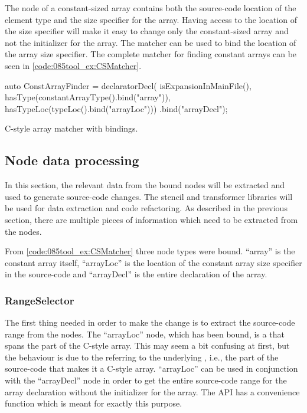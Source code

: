 The  node of a constant-sized array contains both the source-code location of the element type and the size specifier for the array. 
Having access to the location of the size specifier will make it easy to change only the constant-sized array and not the initializer for the array. 
The  matcher can be used to bind the location of the array size specifier.
The complete matcher for finding constant arrays can be seen in \cref{code:085tool_ex:CSMatcher}.

\begin{listing}[H]
    \begin{cppcode}
auto ConstArrayFinder = 
    declaratorDecl(
        isExpansionInMainFile(),
        hasType(constantArrayType().bind("array")),
        hasTypeLoc(typeLoc().bind("arrayLoc")))
    .bind("arrayDecl");
    \end{cppcode}
    \caption{C-style array matcher with bindings.}
    \label{code:085tool_ex:CSMatcher}
\end{listing}

\pagebreak
\subsection{Node data processing}

In this section, the relevant data from the bound nodes will be extracted and used to generate source-code changes. The stencil and transformer libraries will be used for data extraction and code refactoring.
As described in the previous section, there are multiple pieces of information which need to be extracted from the nodes. 

From \cref{code:085tool_ex:CSMatcher} three node types were bound. ``array'' is the constant array itself, ``arrayLoc'' is the location of the constant array size specifier in the source-code and ``arrayDecl'' is the entire declaration of the array.

\subsubsection*{RangeSelector}
The first thing needed in order to make the change is to extract the source-code range from the nodes. The ``arrayLoc'' node, which has been bound, is a  that spans the  part of the C-style array.
This may seem a bit confusing at first, but the behaviour is due to the  referring to the underlying , i.e., the part of the source-code that makes it a C-style array.
``arrayLoc'' can be used in conjunction with the ``arrayDecl'' node in order to get the entire source-code range for the array declaration without the initializer for the array. The  API has a convenience function  which is meant for exactly this purpose.

